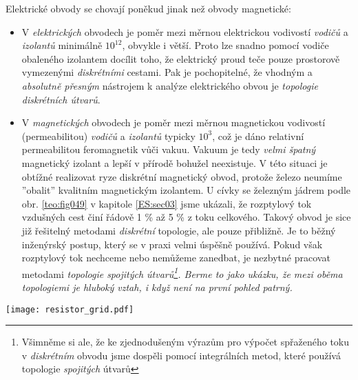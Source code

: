   Elektrické obvody se chovají poněkud jinak než obvody magnetické: 
  \begin{itemize}[noitemsep]
    \item V \emph{elektrických} obvodech je poměr mezi měrnou elektrickou vodivostí \emph{vodičů} a
          \emph{izolantů} minimálně $10^{12}$, obvykle i větší. Proto lze snadno pomocí vodiče
          obaleného izolantem docílit toho, že elektrický proud teče pouze prostorově vymezenými
          \emph{diskrétními} cestami. Pak je pochopitelné, že vhodným a \emph{absolutně přesným}
          nástrojem k analýze elektrického obvou je \emph{topologie diskrétních útvarů}.
    \item V \emph{magnetických} obvodech je poměr mezi měrnou magnetickou vodivostí (permeabilitou)
          \emph{vodičů} a \emph{izolantů} typicky $10^{3}$, což je dáno relativní permeabilitou
          feromagnetik vůči vakuu. Vakuum je tedy \emph{velmi špatný} magnetický izolant a lepší v
          přírodě bohužel neexistuje. V této situaci je obtížné realizovat ryze diskrétní magnetický
          obvod, protože železo neumíme ''obalit'' kvalitním magnetickým izolantem. U cívky se
          železným jádrem podle obr. \ref{teo:fig049} v kapitole \ref{ES:sec03} 
          jsme ukázali, že rozptylový tok vzdušných cest činí řádově 1 \% až 5 \% z toku celkového. 
          Takový obvod je sice již řešitelný metodami \emph{diskrétní} topologie, ale pouze 
          přibližně. Je to běžný inženýrský postup, který se v praxi velmi úspěšně používá. Pokud 
          však rozptylový tok nechceme nebo nemůžeme zanedbat, je nezbytné pracovat metodami 
          \emph{topologie spojitých útvarů\footnote{Všimněme si ale, že ke zjednodušeným výrazům 
          pro výpočet spřaženého toku v \emph{diskrétním} obvodu jsme dospěli pomocí integrálních 
          metod, které používá topologie \emph{spojitých} útvarů}. Berme to jako ukázku, že mezi 
          oběma topologiemi je hluboký vztah, i když není na první pohled patrný.}
  \end{itemize} 
%        
   {\centering
    \captionsetup{type=figure}
%    
    \texttt{[image: resistor\_grid.pdf]}
    \label{ES:fig_res_grid}
    \par}       
    \vspace{1em}

